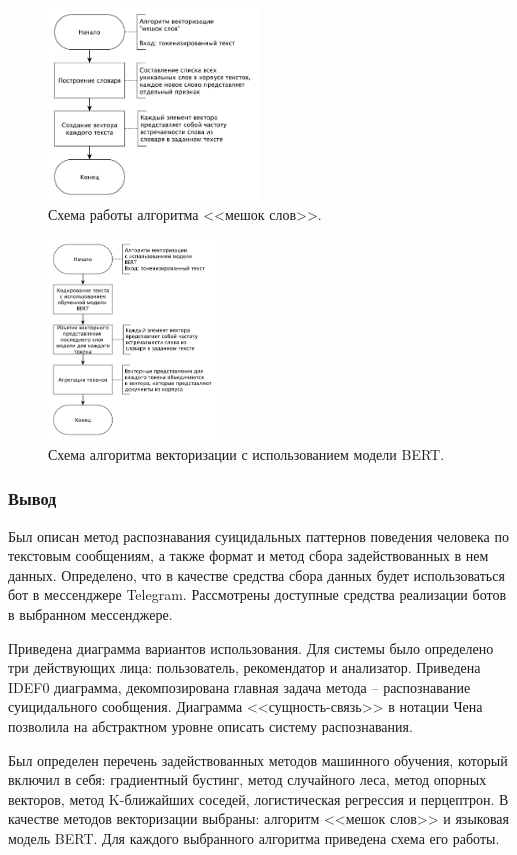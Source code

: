 \begin{figure}[H]
	\centering
	\includegraphics[width=0.5\textwidth]{inc/schemeBagOfWords.pdf}
	\caption{ Схема работы алгоритма <<мешок слов>>. }
	\label{img:schemeBagOfWords}
\end{figure}

\begin{figure}[H]
	\centering
	\includegraphics[width=0.4\textwidth]{inc/schemeBert.pdf}
	\caption{ Схема алгоритма векторизации с использованием модели BERT. }
	\label{img:schemeBert}
\end{figure}

\subsubsection*{Вывод}
Был описан метод распознавания суицидальных паттернов поведения человека по текстовым сообщениям, а также формат и метод сбора задействованных в нем данных. 
Определено, что в качестве средства сбора данных будет использоваться бот в мессенджере Telegram. Рассмотрены доступные средства реализации ботов в выбранном мессенджере.

Приведена диаграмма вариантов использования. Для системы было определено три действующих лица: пользователь, рекомендатор и анализатор. 
Приведена IDEF0 диаграмма, декомпозирована главная задача метода -- распознавание суицидального сообщения. 
Диаграмма <<сущность-связь>> в нотации Чена позволила на абстрактном уровне описать систему распознавания. 

Был определен перечень задействованных методов машинного обучения, который включил в себя: градиентный бустинг, метод случайного леса, метод опорных векторов, метод K-ближайших соседей, логистическая регрессия и перцептрон. 
В качестве методов векторизации выбраны: алгоритм <<мешок слов>> и языковая модель BERT.
Для каждого выбранного алгоритма приведена схема его работы.

\pagebreak